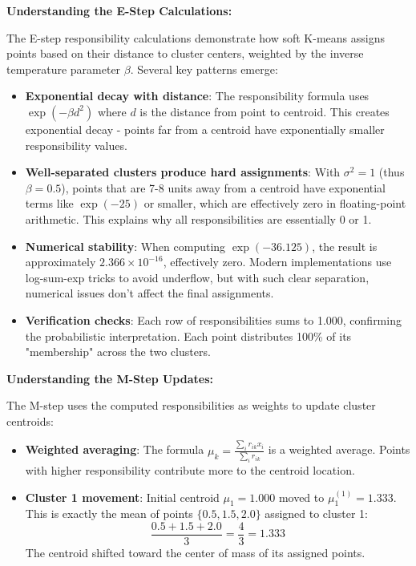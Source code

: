 \documentclass[12pt]{article}
\begin{document}
\begin{explanation}

\textbf{Understanding the E-Step Calculations:}

The E-step responsibility calculations demonstrate how soft K-means assigns points based on their distance to cluster centers, weighted by the inverse temperature parameter $\beta$. Several key patterns emerge:

\begin{itemize}
    \item \textbf{Exponential decay with distance}: The responsibility formula uses $\exp(-\beta d^2)$ where $d$ is the distance from point to centroid. This creates exponential decay - points far from a centroid have exponentially smaller responsibility values.

    \item \textbf{Well-separated clusters produce hard assignments}: With $\sigma^2 = 1$ (thus $\beta = 0.5$), points that are 7-8 units away from a centroid have exponential terms like $\exp(-25)$ or smaller, which are effectively zero in floating-point arithmetic. This explains why all responsibilities are essentially 0 or 1.

    \item \textbf{Numerical stability}: When computing $\exp(-36.125)$, the result is approximately $2.366 \times 10^{-16}$, effectively zero. Modern implementations use log-sum-exp tricks to avoid underflow, but with such clear separation, numerical issues don't affect the final assignments.

    \item \textbf{Verification checks}: Each row of responsibilities sums to 1.000, confirming the probabilistic interpretation. Each point distributes 100\% of its "membership" across the two clusters.
\end{itemize}

\textbf{Understanding the M-Step Updates:}

The M-step uses the computed responsibilities as weights to update cluster centroids:

\begin{itemize}
    \item \textbf{Weighted averaging}: The formula $\mu_k = \frac{\sum_i r_{ik}x_i}{\sum_i r_{ik}}$ is a weighted average. Points with higher responsibility contribute more to the centroid location.

    \item \textbf{Cluster 1 movement}: Initial centroid $\mu_1 = 1.000$ moved to $\mu_1^{(1)} = 1.333$. This is exactly the mean of points $\{0.5, 1.5, 2.0\}$ assigned to cluster 1:
    \[
    \frac{0.5 + 1.5 + 2.0}{3} = \frac{4}{3} = 1.333
    \]
    The centroid shifted toward the center of mass of its assigned points.


\end{itemize}
\end{explanation}
\end{document}
